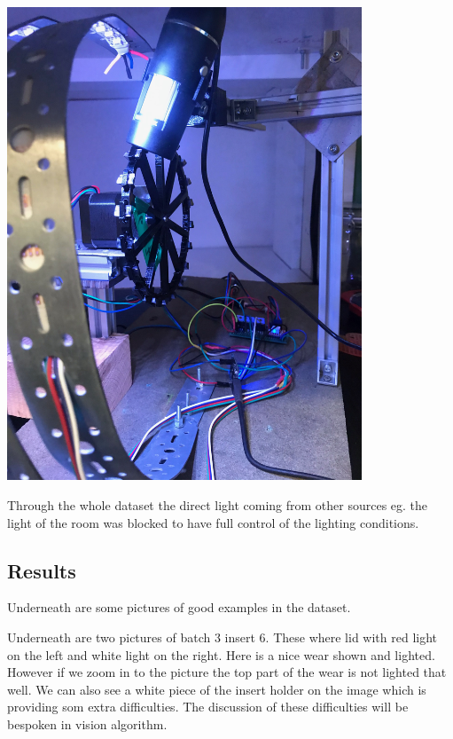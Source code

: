 \includegraphics[width=4.166667in, keepaspectratio=true]{./fig/Vision/Dataset/automated_datasets/2_created_datasets/2_Spaghetti_dataset/IMG_9296.jpeg}



Through the whole dataset the direct light coming from other sources eg. the light of the room was blocked to have full control of the lighting conditions.



\subsection{Results}

Underneath are some pictures of good examples in the dataset.



Underneath are two pictures of batch 3 insert 6. These where lid with red light on the left and white light on the right. Here is a nice wear shown and lighted. However if we zoom in to the picture the top part of the wear is not lighted that well. We can also see a white piece of the insert holder on the image which is providing som extra difficulties. The discussion of these difficulties will be bespoken in vision algorithm.

